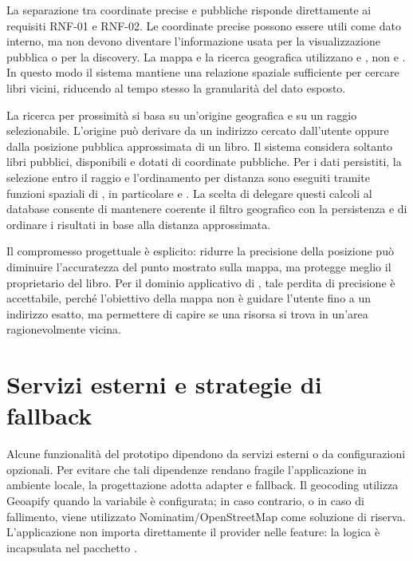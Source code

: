 La separazione tra coordinate precise e pubbliche risponde direttamente ai requisiti RNF-01 e RNF-02. Le coordinate precise possono essere utili come dato interno, ma non devono diventare l'informazione usata per la visualizzazione pubblica o per la discovery. La mappa e la ricerca geografica utilizzano  e , non  e . In questo modo il sistema mantiene una relazione spaziale sufficiente per cercare libri vicini, riducendo al tempo stesso la granularità del dato esposto.

La ricerca per prossimità si basa su un'origine geografica e su un raggio selezionabile. L'origine può derivare da un indirizzo cercato dall'utente oppure dalla posizione pubblica approssimata di un libro. Il sistema considera soltanto libri pubblici, disponibili e dotati di coordinate pubbliche. Per i dati persistiti, la selezione entro il raggio e l'ordinamento per distanza sono eseguiti tramite funzioni spaziali di \postgis{}, in particolare  e . La scelta di delegare questi calcoli al database consente di mantenere coerente il filtro geografico con la persistenza e di ordinare i risultati in base alla distanza approssimata.

Il compromesso progettuale è esplicito: ridurre la precisione della posizione può diminuire l'accuratezza del punto mostrato sulla mappa, ma protegge meglio il proprietario del libro. Per il dominio applicativo di \projectname{}, tale perdita di precisione è accettabile, perché l'obiettivo della mappa non è guidare l'utente fino a un indirizzo esatto, ma permettere di capire se una risorsa si trova in un'area ragionevolmente vicina.

\section{Servizi esterni e strategie di fallback}
\label{sec:servizi-esterni-fallback}

Alcune funzionalità del prototipo dipendono da servizi esterni o da configurazioni opzionali. Per evitare che tali dipendenze rendano fragile l'applicazione in ambiente locale, la progettazione adotta adapter e fallback. Il geocoding utilizza Geoapify quando la variabile  è configurata; in caso contrario, o in caso di fallimento, viene utilizzato Nominatim/OpenStreetMap come soluzione di riserva. L'applicazione non importa direttamente il provider nelle feature: la logica è incapsulata nel pacchetto .

